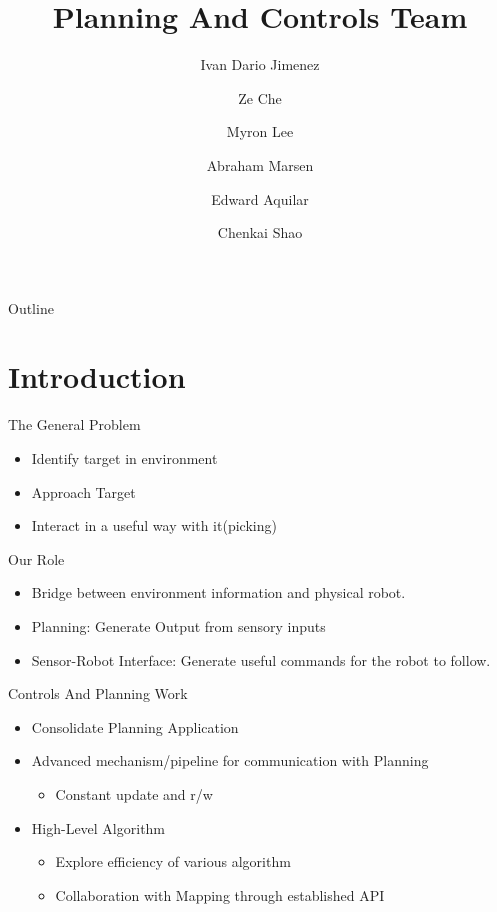 \documentclass[pdf]{beamer}
\title{Planning And Controls Team}
\author{Ivan Dario Jimenez \and Ze Che \and Myron Lee \and Abraham Marsen \and Edward Aquilar \and Chenkai Shao}
\begin{document}
\newcommand{\myfigure}[3]{
\begin{figure}[h!]
  \centering
  \texttt{[image: \#1]}
  \caption{#2}
\end{figure}
}

\begin{frame}
  \titlepage
\end{frame}

 \begin{frame}{Outline}
   \begin{multicols}{2}
    \tableofcontents     
   \end{multicols}
 \end{frame}

\section{Introduction}

\begin{frame}{The General Problem}
  \begin{itemize}
  \item Identify target in environment
  \item Approach Target
  \item Interact in a useful way with it(picking)
  \end{itemize}
\end{frame}

\begin{frame}{Our Role}
  \begin{itemize}
  \item Bridge between environment information and physical robot.
  \item Planning: Generate Output from sensory inputs
  \item Sensor-Robot Interface: Generate useful commands for the robot to follow.
  \end{itemize}
\end{frame}

\begin{frame}{Controls And Planning Work}
  \begin{itemize}
  \item Consolidate Planning Application
  \item Advanced mechanism/pipeline for communication with Planning
    \begin{itemize}
    \item Constant update and r/w
    \end{itemize}
   \item High-Level Algorithm
     \begin{itemize}
     \item Explore efficiency of various algorithm
     \item Collaboration with Mapping through established API
     \end{itemize}
  \end{itemize}
\end{frame}
\end{document}
